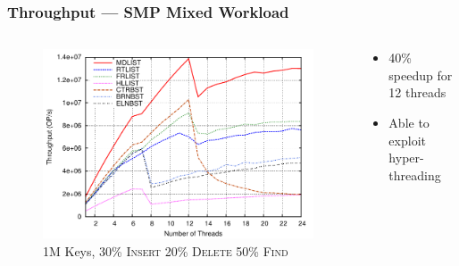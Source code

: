 \documentclass{beamer}
\begin{document}
\begin{frame} \frametitle{Throughput --- SMP Mixed Workload}
    \begin{columns}
        \begin{column}{8cm}
            \begin{figure}[t]
                \centering
                \includegraphics[width=1\columnwidth]{intel30ins4Mkey.pdf}
                \caption{1M Keys, 30\% \textsc{Insert} 20\% \textsc{Delete} 50\% \textsc{Find}}
                \end{figure}
            \end{column}
            \begin{column}{4.3cm}
                \begin{itemize}
                    \item 40\% speedup for 12 threads
                    \item Able to exploit hyper-threading
                \end{itemize}
            \end{column}
        \end{columns}
\end{frame}
\end{document}
